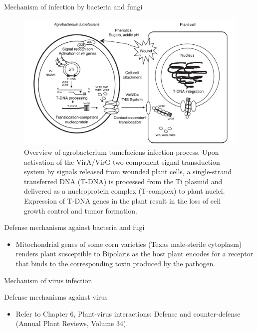 \documentclass[11pt,dvipsnames,ignorenonframetext,aspectratio=169]{beamer}
\providecommand{\tightlist}{%
  \setlength{\itemsep}{0pt}\setlength{\parskip}{0pt}}
\begin{document}
\begin{frame}{Mechanism of infection by bacteria and fungi}
\protect\hypertarget{mechanism-of-infection-by-bacteria-and-fungi}{}
\begin{figure}

{\centering \includegraphics[width=0.66\linewidth]{../images/agrobacterium-transformation} 

}

\caption{Overview of agrobacterium tumefaciens infection process. Upon activation of the VirA/VirG two-component signal transduction system by signals released from wounded plant cells, a single-strand transferred DNA (T-DNA) is processed from the Ti plasmid and delivered as a nucleoprotein complex (T-complex) to plant nuclei. Expression of T-DNA genes in the plant result in the loss of cell growth control and tumor formation.}\label{fig:mechanism-of-infection}
\end{figure}
\end{frame}

\begin{frame}{Defense mechanisms against bacteria and fugi}
\protect\hypertarget{defense-mechanisms-against-bacteria-and-fugi}{}
\begin{itemize}
\tightlist
\item
  Mitochondrial genes of some corn varieties (Texas male-sterile
  cytoplasm) renders plant susceptible to Bipolaris as the host plant
  encodes for a receptor that binds to the corresponding toxin produced
  by the pathogen.
\end{itemize}
\end{frame}

\begin{frame}{Mechanism of virus infection}
\protect\hypertarget{mechanism-of-virus-infection}{}
\end{frame}

\begin{frame}{Defense mechanisms against virus}
\protect\hypertarget{defense-mechanisms-against-virus}{}
\begin{itemize}
\tightlist
\item
  Refer to Chapter 6, Plant-virus interactions: Defense and
  counter-defense \citet{lewsey2009plant} (Annual Plant Reviews, Volume
  34).
\end{itemize}
\end{frame}
\end{document}
